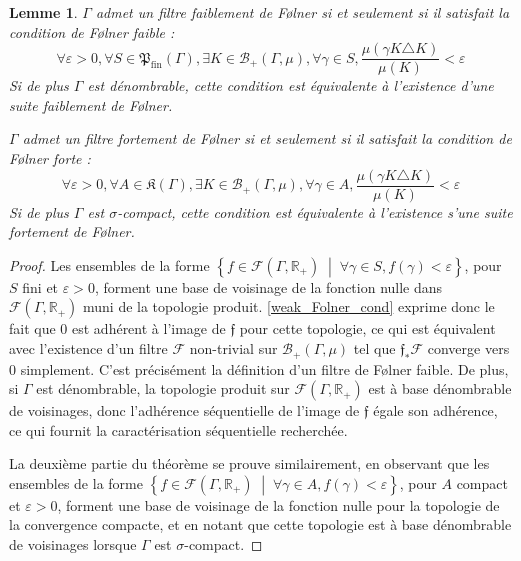 \documentclass[a4paper,12pt]{article}
\newtheorem{lemma}[theorem]{Lemme}
\newcommand{\R}{\mathbb{R}}
\newcommand{\Bor}{\mathcal{B}}
\newcommand{\set}[1]{\left\{ #1 \right\}}
\newcommand{\tq}{\;\middle|\;}
\newcommand{\ssi}{si et seulement si }
\newcommand{\finparts}{\mathfrak{P}_{\mathrm{fin}}}
\begin{document}
\begin{lemma}\label{Folner_filter_of_cond}
    $\Gamma$ admet un filtre faiblement de F\o{}lner \ssi il satisfait la 
    \emph{condition de F\o{}lner faible} :
    \begin{equation}\label{weak_Folner_cond}\tag{WF}
        \forall\varepsilon>0, \forall S\in\finparts(\Gamma), \exists K\in\Bor_+(\Gamma, \mu), \forall \gamma\in S, 
        \frac{\mu(\gamma K\triangle K)}{\mu(K)}<\varepsilon
    \end{equation}
    Si de plus $\Gamma$ est dénombrable, cette condition est équivalente à l'existence d'une \emph{suite} faiblement de F\o{}lner.

    $\Gamma$ admet un filtre fortement de F\o{}lner \ssi il satisfait la \emph{condition de F\o{}lner forte} : 
    \begin{equation}\label{strong_Folner_cond}\tag{SF}
        \forall\varepsilon>0, \forall A\in\mathfrak{K}(\Gamma), \exists K\in\Bor_+(\Gamma, \mu), \forall\gamma\in A, 
        \frac{\mu(\gamma K\triangle K)}{\mu(K)}<\varepsilon
    \end{equation}
    Si de plus $\Gamma$ est $\sigma$-compact, cette condition est équivalente à l'existence s'une \emph{suite} fortement de F\o{}lner.
\end{lemma}

\begin{proof}
    Les ensembles de la forme $\set{f \in \mathcal{F}(\Gamma, \R_+) \tq \forall\gamma\in S, f(\gamma) < \varepsilon}$, pour $S$ fini et $\varepsilon>0$, 
    forment une base de voisinage de la fonction nulle dans $\mathcal{F}(\Gamma, \R_+)$ muni de la topologie produit. \eqref{weak_Folner_cond} exprime donc 
    le fait que $0$ est adhérent à l'image de $\mathfrak{f}$ pour cette topologie, ce qui est équivalent avec 
    l'existence d'un filtre $\mathscr{F}$ non-trivial sur $\Bor_+(\Gamma, \mu)$ tel que $\mathfrak{f}_*\mathscr{F}$ converge vers $0$
    simplement. C'est précisément la définition d'un filtre de F\o{}lner faible.
    De plus, si $\Gamma$ est dénombrable, la topologie produit sur $\mathcal{F}(\Gamma, \R_+)$ est à base dénombrable de voisinages,
    donc l'adhérence séquentielle de l'image de $\mathfrak{f}$ égale son adhérence, ce qui fournit la caractérisation séquentielle recherchée.

    La deuxième partie du théorème se prouve similairement, en observant que les ensembles de la forme 
    $\set{f \in \mathcal{F}(\Gamma, \R_+) \tq \forall\gamma\in A, f(\gamma) < \varepsilon}$, pour $A$ compact et $\varepsilon>0$, 
    forment une base de voisinage de la fonction nulle pour la topologie de la convergence compacte, et en notant que cette 
    topologie est à base dénombrable de voisinages lorsque $\Gamma$ est $\sigma$-compact.
\end{proof}
\end{document}

